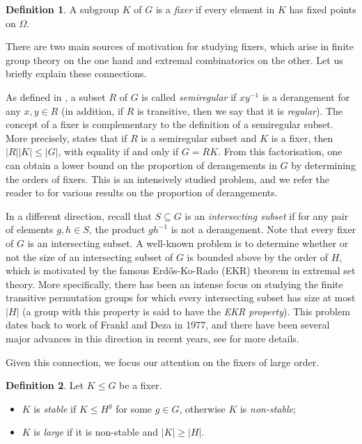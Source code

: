 \documentclass[twoside,a4paper,reqno,11pt]{amsart}
\newcommand{\<}{\langle}
\renewcommand{\>}{\rangle}
\newcommand{\leqs}{\leqslant}
\newcommand{\geqs}{\geqslant}
\newcommand{\Spec}{\mathrm{spec}}
\theoremstyle{definition}
\newtheorem*{definition}{Definition}
\begin{document}
	\begin{definition}
		\label{def:fixer}
		A subgroup $K$ of $G$ is a \textit{fixer} if every element in $K$ has fixed points on $\Omega$.
	\end{definition}
	
	\def\Spec{{\sf Spec}}
	
	There are two main sources of motivation for studying fixers, which arise in finite group theory on the one hand and extremal combinatorics on the other. Let us briefly explain these connections. 
	
	As defined in \cite{LPSX_intersecting}, a subset $R$ of $G$ is called {\em semiregular} if $xy^{-1}$ is a derangement for any $x,y\in R$ (in addition, if $R$ is transitive, then we say that it is {\em regular}). The concept of a fixer is complementary to the definition of a semiregular subset. More precisely, \cite[Proposition 1.1]{LPSX_intersecting} states that if $R$ is a semiregular subset and $K$ is a fixer, then $|R||K|\leqs |G|$, with equality if and only if $G = RK$. From this factorisation, one can obtain a lower bound on the proportion of derangements in $G$ by determining the orders of fixers. This is an intensively studied problem, and we refer the reader to \cite{CC_der,FG_der_18,GIP_der} for various results on the proportion of derangements.
	
	In a different direction, recall that $S\subseteq G$ is an {\it intersecting subset} if for any pair of elements $g,h\in S$, the product $gh^{-1}$ is not a derangement. Note that every fixer of $G$ is an intersecting subset. A well-known problem is to determine whether or not the size of an intersecting subset of $G$ is bounded above by the order of $H$, which is motivated by the famous Erdős-Ko-Rado (EKR) theorem \cite{EKR_EKR} in extremal set theory. More specifically, there has been an intense focus on studying the finite transitive permutation groups for which every intersecting subset has size at most $|H|$ (a group with this property is said to have the \textit{EKR property}). This problem dates back to work of Frankl and Deza \cite{FD_EKR} in 1977, and there have been several major advances in this direction in recent years, see \cite{AM_EKR,EFP_EKR,LPSX_EKR,MR_EKR,MST_2-trans} for more details.
	
	Given this connection, we focus our attention on the fixers of large order.
	
	\begin{definition}\label{def:max-fixer}
		Let $K \leqs G$ be a fixer.
		\begin{itemize}\addtolength{\itemsep}{0.2\baselineskip}
			\item[{\rm (i)}] $K$ is \textit{stable} if $K \leqs H^g$ for some $g \in G$, otherwise $K$ is \textit{non-stable};
			\item[{\rm (ii)}] $K$ is {\em large} if it is non-stable and $|K| \geqs |H|$.
		\end{itemize}
	\end{definition}
	
\end{document}
